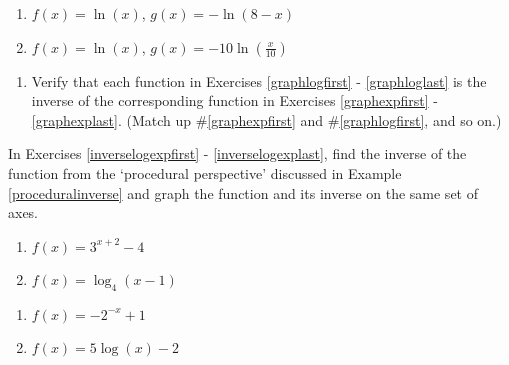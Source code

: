 \begin{multicols}{2}
\begin{enumerate}
\setcounter{enumi}{\value{HW}}


\item  $f(x) = \ln(x)$, $g(x) = -\ln(8-x)$

\item  $f(x) = \ln(x)$, $g(x) = -10\ln\left(\frac{x}{10}\right)$ \label{graphloglast}

\setcounter{HW}{\value{enumi}}
\end{enumerate}
\end{multicols}

\begin{enumerate}
\setcounter{enumi}{\value{HW}}

\smallskip

\item  Verify that each function in Exercises \ref{graphlogfirst} - \ref{graphloglast} is the inverse of the corresponding function in Exercises \ref{graphexpfirst} - \ref{graphexplast}.  (Match up \#\ref{graphexpfirst} and \#\ref{graphlogfirst}, and so on.)

\setcounter{HW}{\value{enumi}}
\end{enumerate}

In Exercises \ref{inverselogexpfirst} - \ref{inverselogexplast},  find the inverse of the function from the `procedural perspective' discussed in Example \ref{proceduralinverse} and graph the function and its inverse on the same set of axes.

\begin{multicols}{2}
\begin{enumerate}
\setcounter{enumi}{\value{HW}}

\item $f(x) = 3^{x + 2} - 4$  \label{inverselogexpfirst} 
\item $f(x) = \log_{4}(x - 1)$

\setcounter{HW}{\value{enumi}}
\end{enumerate}
\end{multicols}

\enlargethispage{.5in}
\vspace{-.2in}

\begin{multicols}{2}
\begin{enumerate}
\setcounter{enumi}{\value{HW}}

\item $f(x) = -2^{-x} + 1$
\item $f(x) = 5\log(x) - 2$ \label{inverselogexplast}

\setcounter{HW}{\value{enumi}}
\end{enumerate}
\end{multicols}
\vspace{-.2in}

